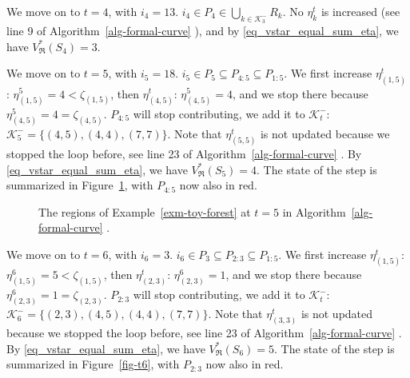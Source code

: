 \documentclass[
  11pt,
  a4paper,
]{article}
\theoremstyle{plain}
\theoremstyle{plain}
\theoremstyle{plain}
\theoremstyle{definition}
\theoremstyle{definition}
\theoremstyle{remark}
\begin{document}
We move on to \(t=4\), with \(i_4=13\).
\(i_4\in P_4\in \bigcup_{k\in\mathcal{K}^-_3}R_k\). No \(\eta_k^t\) is
increased (see line 9 of  Algorithm~\ref{alg-formal-curve} ), and by
\eqref{eq_vstar_equal_sum_eta}, we have \(V^*_{\mathfrak{R}}(S_4)=3\).

We move on to \(t=5\), with \(i_5=18\).
\(i_5\in P_5\subseteq P_{4:5}\subseteq P_{1:5}\). We first increase
\(\eta_{(1,5)}^t\): \(\eta_{(1,5)}^5=4<\zeta_{(1,5)}\), then
\(\eta_{(4,5)}^t\): \(\eta_{(4,5)}^5=4\), and we stop there because
\(\eta_{(4,5)}^5=4=\zeta_{(4,5)}\). \(P_{4:5}\) will stop contributing,
we add it to \(\mathcal{K}^-_t\):
\(\mathcal{K}^-_5=\{(4,5), (4, 4), (7, 7)\}\). Note that
\(\eta_{(5,5)}^t\) is not updated because we stopped the loop before,
see line 23 of  Algorithm~\ref{alg-formal-curve} . By
\eqref{eq_vstar_equal_sum_eta}, we have \(V^*_{\mathfrak{R}}(S_5)=4\).
The state of the step is summarized in Figure~\ref{fig-t5}, with
\(P_{4:5}\) now also in red.

\begin{figure}


\caption{\label{fig-t5}The regions of Example~\ref{exm-toy-forest} at
\(t=5\) in  Algorithm~\ref{alg-formal-curve} .}

\end{figure}%

We move on to \(t=6\), with \(i_6=3\).
\(i_6\in P_3\subseteq P_{2:3}\subseteq P_{1:5}\). We first increase
\(\eta_{(1,5)}^t\): \(\eta_{(1,5)}^6=5<\zeta_{(1,5)}\), then
\(\eta_{(2,3)}^t\): \(\eta_{(2,3)}^6=1\), and we stop there because
\(\eta_{(2,3)}^6=1=\zeta_{(2,3)}\). \(P_{2:3}\) will stop contributing,
we add it to \(\mathcal{K}^-_t\):
\(\mathcal{K}^-_6=\{(2,3), (4,5), (4, 4), (7, 7)\}\). Note that
\(\eta_{(3,3)}^t\) is not updated because we stopped the loop before,
see line 23 of  Algorithm~\ref{alg-formal-curve} . By
\eqref{eq_vstar_equal_sum_eta}, we have \(V^*_{\mathfrak{R}}(S_6)=5\).
The state of the step is summarized in Figure~\ref{fig-t6}, with
\(P_{2:3}\) now also in red.
\end{document}
